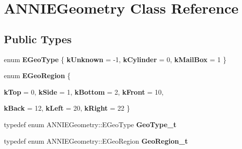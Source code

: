 \hypertarget{classANNIEGeometry}{
\section{ANNIEGeometry Class Reference}
\label{classANNIEGeometry}
}
\subsection*{Public Types}
\begin{DoxyCompactItemize}
\item 
enum {\bfseries EGeoType} \{ {\bfseries kUnknown} =  -\/1, 
{\bfseries kCylinder} =  0, 
{\bfseries kMailBox} =  1
 \}
\item 
enum {\bfseries EGeoRegion} \{ \par
{\bfseries kTop} =  0, 
{\bfseries kSide} =  1, 
{\bfseries kBottom} =  2, 
{\bfseries kFront} =  10, 
\par
{\bfseries kBack} =  12, 
{\bfseries kLeft} =  20, 
{\bfseries kRight} =  22
 \}
\item 
\hypertarget{classANNIEGeometry_ab5d29d11590e8129e6690899d0f84584}{
typedef enum ANNIEGeometry::EGeoType {\bfseries GeoType\_\-t}}
\label{classANNIEGeometry_ab5d29d11590e8129e6690899d0f84584}

\item 
\hypertarget{classANNIEGeometry_acf5083108f2f5a2d8ee98fe5aaa6e596}{
typedef enum ANNIEGeometry::EGeoRegion {\bfseries GeoRegion\_\-t}}
\label{classANNIEGeometry_acf5083108f2f5a2d8ee98fe5aaa6e596}

\end{DoxyCompactItemize}
